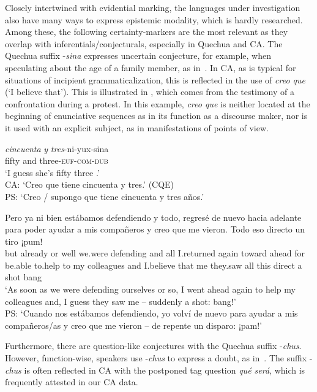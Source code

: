 \documentclass[output=paper,hidelinks]{langscibook}
\begin{document}
Closely intertwined with evidential marking, the languages under investigation also have many ways to express epistemic modality, which is hardly researched. Among these, the following certainty-markers are the most relevant as they overlap with inferentials/conjecturals, especially in Quechua and CA. The Quechua suffix -\textit{sina} expresses uncertain conjecture, for example, when speculating about the age of a family member, as in~. In CA, as is typical for situations of incipient grammaticalization, this is reflected in the use of \textit{creo que} (`I believe that'). This is illustrated in , which comes from the testimony of a confrontation during a protest. In this example, \textit{creo que} is neither located at the beginning of enunciative sequences as in its function as a discourse maker, nor is it used with an explicit subject, as in manifestations of points of view.

\ea \label{ex:dub}
\gll \textit{cincuenta} \textit{y} \textit{tres}-ni-yux-sina \\
fifty and three-\textsc{euf-com-dub} \\ 
\glt ‘I guess she's fifty three .’ \\
CA: `Creo que tiene cincuenta y tres.' (CQE)\\
PS: `Creo / supongo que tiene cincuenta y tres años.'
\z


\ea \label{ex:shot}
\gll Pero ya ni bien estábamos defendiendo y todo, regresé {de nuevo} hacia adelante para poder ayudar a mis compañeros y creo que me vieron. Todo eso directo un tiro ¡pum! \\
but already or well we.were defending and all I.returned again toward ahead for be.able to.help to my colleagues and I.believe that me they.saw all this direct a shot bang \\
\glt ‘As soon as we were defending ourselves or so, I went ahead again to help my colleagues and, I guess they saw me -- suddenly a shot: bang!’ \citet[97]{Defensoria2020} \\
PS: `Cuando nos estábamos defendiendo, yo volví de nuevo para ayudar a mis compañeros/as y creo que me vieron – de repente un disparo: ¡pam!'
\z

Furthermore, there are question-like conjectures with the Quechua suffix \mbox{-\textit{chus}}. However, function-wise, speakers use -\textit{chus} to express a doubt, as in~. The suffix -\textit{chus} is often reflected in CA with the postponed tag question \textit{qué será}, which is frequently attested in our CA data.
\end{document}
